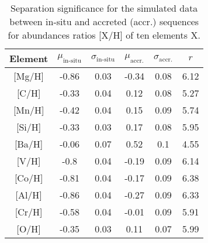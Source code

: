 \begin{table}
    \centering
    \caption{Separation significance for the simulated data between in-situ and accreted (accr.) sequences for abundances ratios [X/H] of ten elements X.}
    \begin{tabular}{cccccc}
    \hline
    Element & $\mu_\text{in-situ}$ & $\sigma_\text{in-situ}$ & $\mu_\text{accr.}$ & $\sigma_\text{accr.}$ & $r$\\
    \hline \hline
    {[Mg/H]}  & -0.86 & 0.03 & -0.34 & 0.08 & 6.12 \\
    {[C/H]}  & -0.33 & 0.04 & 0.12 & 0.08 & 5.27 \\
    {[Mn/H]}  & -0.42 & 0.04 & 0.15 & 0.09 & 5.74 \\
    {[Si/H]}  & -0.33 & 0.03 & 0.17 & 0.08 & 5.95 \\
    {[Ba/H]}  & -0.06 & 0.07 & 0.52 & 0.1 & 4.55 \\
    {[V/H]}  & -0.8 & 0.04 & -0.19 & 0.09 & 6.14 \\
    {[Co/H]}  & -0.81 & 0.04 & -0.17 & 0.09 & 6.38 \\
    {[Al/H]}  & -0.86 & 0.04 & -0.27 & 0.09 & 6.33 \\
    {[Cr/H]}  & -0.58 & 0.04 & -0.01 & 0.09 & 5.91 \\
    {[O/H]}  & -0.35 & 0.03 & 0.11 & 0.07 & 5.99 \\
    \hline
    \end{tabular}
    \label{tab:r_values_simulation}
\end{table}
